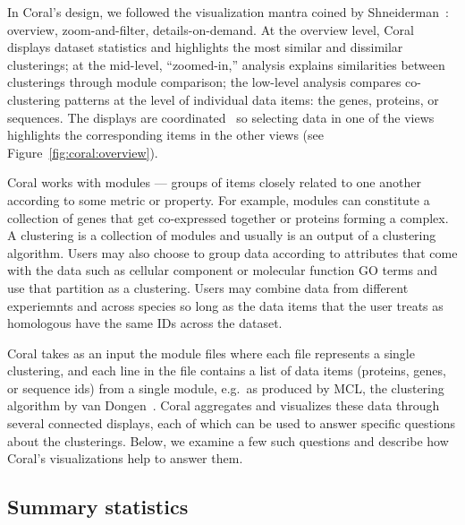 \documentclass[12pt]{cmuthesis}
\makeatletter
\newcommand\Coral{Coral\xspace}
\newcommand{\eg}{e.g.\@}
\makeatother
\begin{document}
  In \Coral's design, we followed the visualization mantra coined by
  Shneiderman~\cite{Shneiderman1996}: overview, zoom-and-filter,
  details-on-demand. At the overview level, \Coral displays dataset statistics and highlights the most similar and dissimilar clusterings; at the mid-level, ``zoomed-in,'' analysis explains similarities between clusterings through module comparison; the low-level analysis compares co-clustering patterns at the level of individual data items: the genes, proteins, or sequences. The displays are coordinated~\cite{North2000} so selecting data in one of the views highlights the corresponding items in the other views (see Figure~\ref{fig:coral:overview}).


  Coral works with modules --- groups of items closely related to one another according to some metric or property. For example, modules can constitute a collection of genes that get co-expressed together or proteins forming a complex. A clustering is a collection of modules and usually is an output of a clustering algorithm. Users may also choose to group data according to attributes that come with the data such as cellular component or molecular function GO terms and use that partition as a clustering. Users may combine data from different experiemnts and across species so long as the data items that the user treats as homologous have the same IDs across the dataset.



  \Coral takes as an input the module files where each file represents a single clustering, and each line in the file contains a list of data items (proteins, genes, or sequence ids) from a single module, \eg~as produced by MCL, the clustering algorithm by van Dongen~\cite{VanDongen2000}. \Coral aggregates and visualizes these data through several connected displays, each of which can be used to answer specific questions about the clusterings. Below, we examine a few such questions and describe how \Coral's visualizations help to answer them.


  \subsection{Summary statistics}
\end{document}
